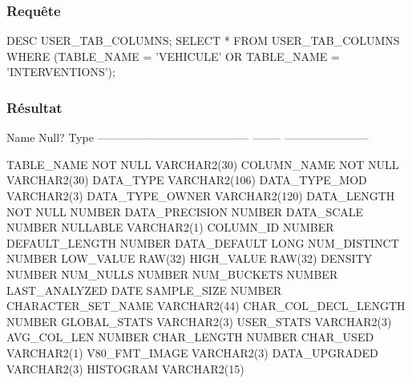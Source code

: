 \documentclass[•]{article}
\begin{document}
\subsubsection{Requête}
\begin{sql}
DESC USER_TAB_COLUMNS;
SELECT * FROM USER_TAB_COLUMNS WHERE (TABLE_NAME = 'VEHICULE' OR TABLE_NAME = 'INTERVENTIONS');
\end{sql}
\subsubsection{Résultat}
\begin{sql}
 Name                                      Null?    Type
 ----------------------------------------- -------- -----------------------

 TABLE_NAME                                NOT NULL VARCHAR2(30)
 COLUMN_NAME                               NOT NULL VARCHAR2(30)
 DATA_TYPE                                          VARCHAR2(106)
 DATA_TYPE_MOD                                      VARCHAR2(3)
 DATA_TYPE_OWNER                                    VARCHAR2(120)
 DATA_LENGTH                               NOT NULL NUMBER
 DATA_PRECISION                                     NUMBER
 DATA_SCALE                                         NUMBER
 NULLABLE                                           VARCHAR2(1)
 COLUMN_ID                                          NUMBER
 DEFAULT_LENGTH                                     NUMBER
 DATA_DEFAULT                                       LONG
 NUM_DISTINCT                                       NUMBER
 LOW_VALUE                                          RAW(32)
 HIGH_VALUE                                         RAW(32)
 DENSITY                                            NUMBER
 NUM_NULLS                                          NUMBER
 NUM_BUCKETS                                        NUMBER
 LAST_ANALYZED                                      DATE
 SAMPLE_SIZE                                        NUMBER
 CHARACTER_SET_NAME                                 VARCHAR2(44)
 CHAR_COL_DECL_LENGTH                               NUMBER
 GLOBAL_STATS                                       VARCHAR2(3)
 USER_STATS                                         VARCHAR2(3)
 AVG_COL_LEN                                        NUMBER
 CHAR_LENGTH                                        NUMBER
 CHAR_USED                                          VARCHAR2(1)
 V80_FMT_IMAGE                                      VARCHAR2(3)
 DATA_UPGRADED                                      VARCHAR2(3)
 HISTOGRAM                                          VARCHAR2(15)


\end{sql}
\end{document}
